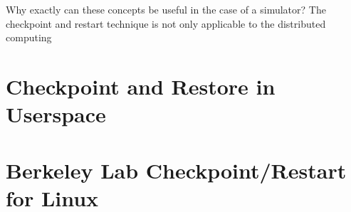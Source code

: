 {Why exactly can these concepts be useful in the case of a simulator? The checkpoint and restart technique is not only applicable to the distributed computing 
  
\section{Checkpoint and Restore in Userspace}\label{sec:criu}
\section{Berkeley Lab Checkpoint/Restart for Linux}\label{sec:blcr}

}